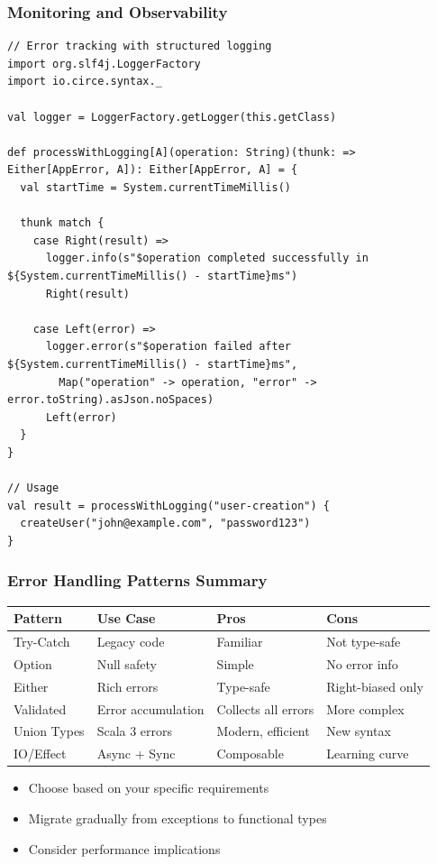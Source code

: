 \documentclass{beamer}
\begin{document}
\begin{frame}[fragile]
\frametitle{Monitoring and Observability}

\begin{lstlisting}[style=scalaStyle]
// Error tracking with structured logging
import org.slf4j.LoggerFactory
import io.circe.syntax._

val logger = LoggerFactory.getLogger(this.getClass)

def processWithLogging[A](operation: String)(thunk: => Either[AppError, A]): Either[AppError, A] = {
  val startTime = System.currentTimeMillis()
  
  thunk match {
    case Right(result) => 
      logger.info(s"$operation completed successfully in ${System.currentTimeMillis() - startTime}ms")
      Right(result)
    
    case Left(error) => 
      logger.error(s"$operation failed after ${System.currentTimeMillis() - startTime}ms", 
        Map("operation" -> operation, "error" -> error.toString).asJson.noSpaces)
      Left(error)
  }
}

// Usage
val result = processWithLogging("user-creation") {
  createUser("john@example.com", "password123")
}
\end{lstlisting}

\end{frame}

\begin{frame}[fragile]
\frametitle{Error Handling Patterns Summary}

\begin{table}[ht]
\centering
\small
\begin{tabular}{|l|l|l|l|}
\hline
\textbf{Pattern} & \textbf{Use Case} & \textbf{Pros} & \textbf{Cons} \\
\hline
Try-Catch & Legacy code & Familiar & Not type-safe \\
\hline
Option & Null safety & Simple & No error info \\
\hline
Either & Rich errors & Type-safe & Right-biased only \\
\hline
Validated & Error accumulation & Collects all errors & More complex \\
\hline
Union Types & Scala 3 errors & Modern, efficient & New syntax \\
\hline
IO/Effect & Async + Sync & Composable & Learning curve \\
\hline
\end{tabular}
\end{table}

\begin{itemize}
\item Choose based on your specific requirements
\item Migrate gradually from exceptions to functional types
\item Consider performance implications
\end{itemize}

\end{frame}
\end{document}
